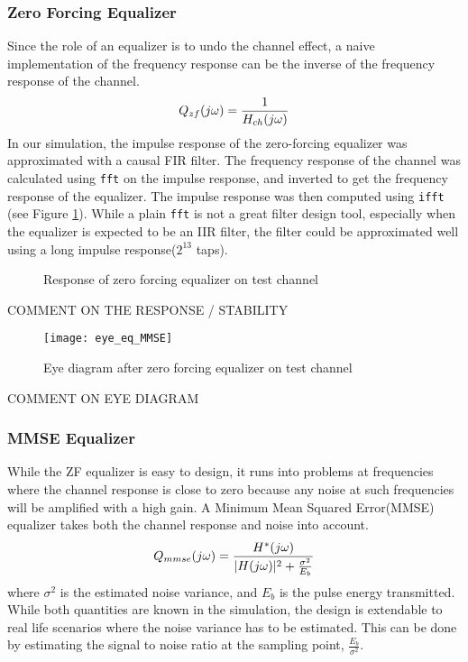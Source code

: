 \subsubsection{Zero Forcing Equalizer}
Since the role of an equalizer is to undo the channel effect, a naive implementation of the frequency response can be the inverse of the frequency response of the channel.
\begin{equation}
 Q_{zf}(j\omega) = \frac{1}{H_{ch}(j\omega)}
 \label{equation:zf}
\end{equation}
In our simulation, the impulse response of the zero-forcing equalizer was approximated with a causal FIR filter. The frequency response of the channel was calculated using \texttt{fft} on the impulse response, and inverted to get the frequency response of the equalizer. The impulse response was then computed using \texttt{ifft} (see Figure \ref{fig:zf_eq}). While a plain \texttt{fft} is not a great filter design tool, especially when the equalizer is expected to be an IIR filter, the filter could be approximated well using a long impulse response($2^{13}$ taps).

\begin{figure}
\caption{Response of zero forcing equalizer on test channel}
\label{fig:zf_eq}
\end{figure}

{\color{red} COMMENT ON THE RESPONSE / STABILITY}

\begin{figure}
\texttt{[image: eye\_eq\_MMSE]}
\caption{Eye diagram after zero forcing equalizer on test channel}
\label{fig:eye_zf_eq}
\end{figure}
{\color{red} COMMENT ON EYE DIAGRAM}

\subsubsection{MMSE Equalizer}
While the ZF equalizer is easy to design, it runs into problems at frequencies where the channel response is close to zero because any noise at such frequencies will be amplified with a high gain. A Minimum Mean Squared Error(MMSE) equalizer takes both the channel response and noise into account. 
\begin{equation}
Q_{mmse}(j\omega) = \frac{H^*(j\omega)}{|H(j\omega)|^2 + \frac{\sigma^2}{E_b}}
\label{equation:mmse}
\end{equation}
where $\sigma^2$ is the estimated noise variance, and $E_b$ is the pulse energy transmitted. While both quantities are known in the simulation, the design is extendable to real life scenarios where the noise variance has to be estimated. This can be done by estimating the signal to noise ratio at the sampling point, $\frac{E_b}{\sigma^2}$.

